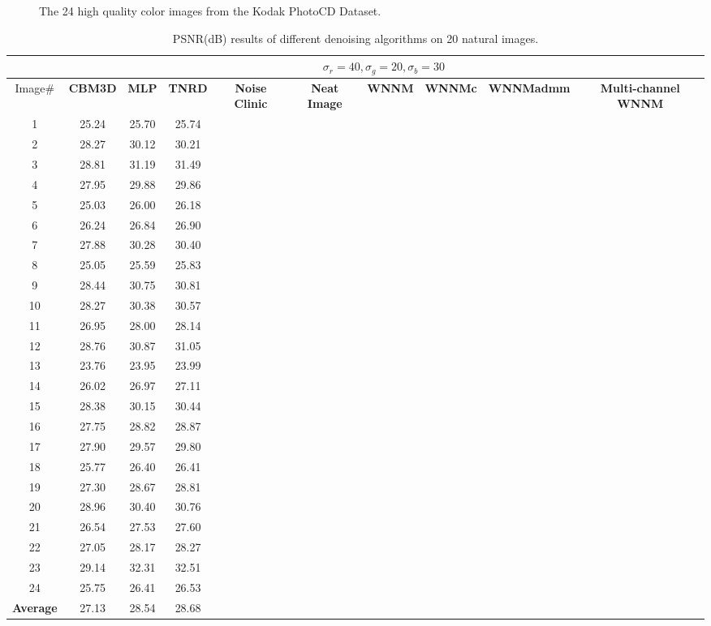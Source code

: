 \documentclass[10pt,twocolumn,letterpaper]{article}
\begin{document}
\begin{figure}
{\begin{minipage}{0.075\textwidth}
\end{minipage}
}\vspace{-1mm}
\caption{The 24 high quality color images from the Kodak PhotoCD Dataset.}
\label{fig3}
\vspace{-2mm}
\end{figure}


\begin{table}[t]
\caption{PSNR(dB) results of different denoising algorithms on 20 natural images.}
\label{tab1}
\begin{center}
\renewcommand\arraystretch{1.0}
\scriptsize
\begin{tabular}{|c||c|c|c|c|c|c|c|c|c|}
\hline
&\multicolumn{9}{c|}{ $\sigma_{r} = 40, \sigma_{g} = 20, \sigma_{b} = 30$}
\\
\hline
\hline
Image\#
&
\textbf{CBM3D}
&
\textbf{MLP}
&
\textbf{TNRD}
&
\textbf{Noise Clinic}
&
\textbf{Neat Image}
&
\textbf{WNNM}
&
\textbf{WNNMc}
&
\textbf{WNNMadmm}
&
\textbf{Multi-channel WNNM}
\\
\hline
1& 25.24 & 25.70 & 25.74 & 
\\
\hline
2& 28.27 & 30.12 & 30.21 & 
\\
\hline
3 & 28.81 & 31.19 & 31.49 & 
\\
\hline 
4 & 27.95 & 29.88 & 29.86 & 
\\
\hline
5 & 25.03 & 26.00 & 26.18 & 
\\
\hline
6 & 26.24 & 26.84 & 26.90 & 
\\
\hline
7 & 27.88 & 30.28 & 30.40 & 
\\
\hline
8 & 25.05 & 25.59 & 25.83 & 
\\
\hline
9 & 28.44 & 30.75 & 30.81 & 
\\
\hline
10 & 28.27 & 30.38 & 30.57 & 
\\
\hline
11 & 26.95 & 28.00 & 28.14 & 
\\
\hline
12 & 28.76 & 30.87 & 31.05 & 
\\
\hline
13 & 23.76 & 23.95 & 23.99 & 
\\
\hline
14 & 26.02 & 26.97 & 27.11 & 
\\
\hline
15 & 28.38 & 30.15 & 30.44 & 
\\
\hline
16 & 27.75 & 28.82 & 28.87 & 
\\
\hline
17 & 27.90 & 29.57 & 29.80 & 
\\
\hline
18 & 25.77 & 26.40 & 26.41 & 
\\
\hline
19 & 27.30 & 28.67 & 28.81 & 
\\
\hline
20 & 28.96 & 30.40 & 30.76 & 
\\
\hline
21 & 26.54 & 27.53 & 27.60 & 
\\
\hline
22 & 27.05 & 28.17 & 28.27 & 
\\
\hline
23 & 29.14 & 32.31 & 32.51 & 
\\
\hline
24 & 25.75 & 26.41 & 26.53 & 
\\
\hline
\textbf{Average} & 27.13 & 28.54 & 28.68 & 
\\
\hline
\end{tabular}
\end{center}
\end{table}
\end{document}
